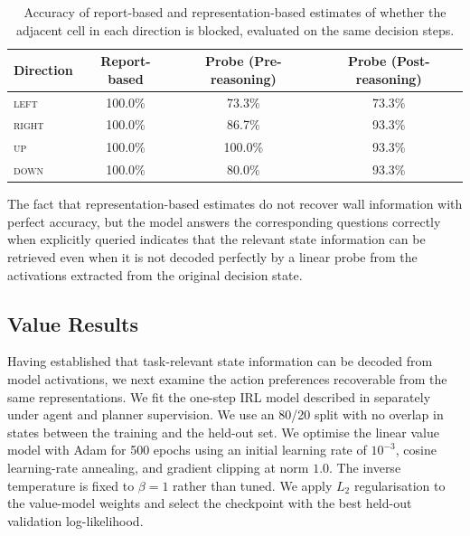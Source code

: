 \documentclass{article}
\begin{document}
\begin{table}[htbp]
\centering
\small
\begin{tabular}{lccc}
\toprule
\textbf{Direction} & \textbf{Report-based} & \textbf{Probe (Pre-reasoning)} & \textbf{Probe (Post-reasoning)}\\
\midrule
\textsc{left}  & 100.0\% & 73.3\%  & 73.3\% \\
\textsc{right} & 100.0\% & 86.7\%  & 93.3\% \\
\textsc{up}    & 100.0\% & 100.0\% & 93.3\% \\
\textsc{down}  & 100.0\% & 80.0\%  & 93.3\% \\
\bottomrule
\end{tabular}
\caption{Accuracy of report-based and representation-based estimates of whether the adjacent cell in each direction is blocked, evaluated on the same decision steps.}
\label{tab:matched-wall}
\end{table}

The fact that representation-based estimates do not recover wall information with perfect accuracy, but the model answers the corresponding questions correctly when explicitly queried indicates that the relevant state information can be retrieved even when it is not decoded perfectly by a linear probe from the activations extracted from the original decision state.

\subsection{Value Results}
\label{sec:value-results}

Having established that task-relevant state information can be decoded from model activations, we next examine the action preferences recoverable from the same representations. 
We fit the one-step IRL model described in  separately under agent and planner supervision.
We use an 80/20 split with no overlap in states between the training and the held-out set.
We optimise the linear value model with Adam for 500 epochs using an initial
learning rate of $10^{-3}$, cosine learning-rate annealing, and gradient
clipping at norm $1.0$. The inverse temperature is fixed to $\beta=1$ rather
than tuned. We apply $L_2$ regularisation to the value-model weights and select the checkpoint with the best held-out validation log-likelihood.
\end{document}
